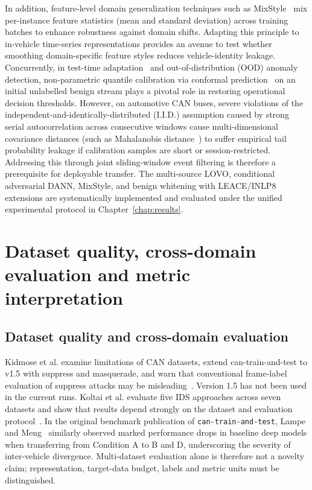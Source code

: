 \documentclass[12pt, a4paper, reqno, oneside]{book}
\begin{document}
In addition, feature-level domain generalization techniques such as MixStyle~\cite{zhou2021mixstyle} mix per-instance feature statistics (mean and standard deviation) across training batches to enhance robustness against domain shifts. Adapting this principle to in-vehicle time-series representations provides an avenue to test whether smoothing domain-specific feature styles reduces vehicle-identity leakage. Concurrently, in test-time adaptation~\cite{wang2020tent} and out-of-distribution (OOD) anomaly detection, non-parametric quantile calibration via conformal prediction~\cite{tibshirani2019conformal} on an initial unlabelled benign stream plays a pivotal role in restoring operational decision thresholds. However, on automotive CAN buses, severe violations of the independent-and-identically-distributed (I.I.D.) assumption caused by strong serial autocorrelation across consecutive windows cause multi-dimensional covariance distances (such as Mahalanobis distance~\cite{lee2018mahalanobis}) to suffer empirical tail probability leakage if calibration samples are short or session-restricted. Addressing this through joint sliding-window event filtering is therefore a prerequisite for deployable transfer. The multi-source LOVO, conditional adversarial DANN, MixStyle, and benign whitening with LEACE/INLP8 extensions are systematically implemented and evaluated under the unified experimental protocol in Chapter~\ref{chap:results}.

\section{Dataset quality, cross-domain evaluation and metric interpretation}
\subsection{Dataset quality and cross-domain evaluation}
Kidmose et al. examine limitations of CAN datasets, extend can-train-and-test to v1.5 with suppress and masquerade, and warn that conventional frame-label evaluation of suppress attacks may be misleading~\cite{kidmose2025cansleuth}. Version 1.5 has not been used in the current runs. Koltai et al. evaluate five IDS approaches across seven datasets and show that results depend strongly on the dataset and evaluation protocol~\cite{koltai2026trust}. In the original benchmark publication of \texttt{can-train-and-test}, Lampe and Meng~\cite{lampe2024curated} similarly observed marked performance drops in baseline deep models when transferring from Condition A to B and D, underscoring the severity of inter-vehicle divergence. Multi-dataset evaluation alone is therefore not a novelty claim; representation, target-data budget, labels and metric units must be distinguished.
\end{document}
